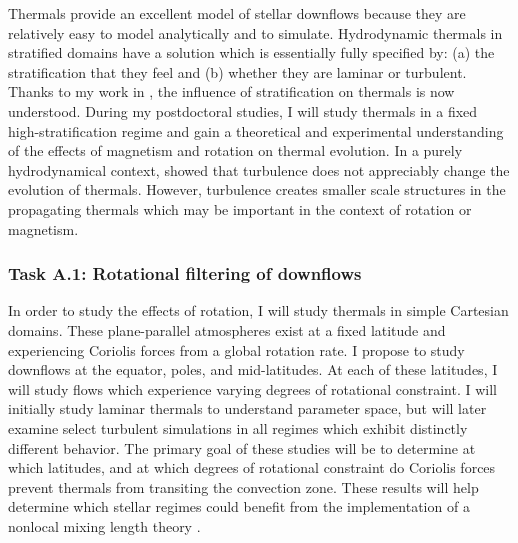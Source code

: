 \documentclass[aasms,11pt, longbibliography]{article}
\begin{document}
Thermals provide an excellent model of stellar downflows because they are relatively easy to model analytically and to simulate.
Hydrodynamic thermals in stratified domains have a solution which is essentially fully specified by: (a) the stratification that they feel and (b) whether they are laminar or turbulent.
Thanks to my work in \citet{andersLB2019}, the influence of stratification on thermals is now understood.
During my postdoctoral studies, I will study thermals in a fixed high-stratification regime and gain a theoretical and experimental understanding of the effects of magnetism and rotation on thermal evolution.
In a purely hydrodynamical context, \citet{lecoanet&jeevanjee2019} showed that turbulence does not appreciably change the evolution of thermals.
However, turbulence creates smaller scale structures in the propagating thermals which may be important in the context of rotation or magnetism.

\subsubsection{Task A.1: Rotational filtering of downflows}
\label{sct:taskA1}
In order to study the effects of rotation, I will study thermals in simple Cartesian domains.
These plane-parallel atmospheres exist at a fixed latitude and experiencing Coriolis forces from a global rotation rate.
I propose to study downflows at the equator, poles, and mid-latitudes.
At each of these latitudes, I will study flows which experience varying degrees of rotational constraint.
I will initially study laminar thermals to understand parameter space, but will later examine select turbulent simulations in all regimes which exhibit distinctly different behavior.
The primary goal of these studies will be to determine at which latitudes, and at which degrees of rotational constraint do Coriolis forces prevent thermals from transiting the convection zone.
These results will help determine which stellar regimes could benefit from the implementation of a nonlocal mixing length theory \citep[as in][]{brandenburg2016}.
\end{document}
